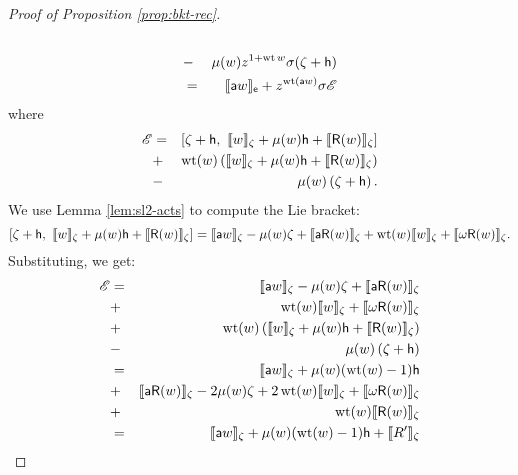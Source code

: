 \begin{proof}[Proof of Proposition \ref{prop:bkt-rec}]
\begin{eqnarray*}
                      \\ &-& \mu(w) z^{1+\operatorname{\mathrm{wt}} w}\sigma(\zeta +\mathsf{h})
                      \\ &=& \llbracket{\mathsf{a}w}\rrbracket_{\mathsf{e}} + z^{\operatorname{\mathrm{wt}}(\mathsf{a} w)} \sigma \mathscr{E}
\end{eqnarray*}
where
\begin{eqnarray*}
        \mathscr{E} &=& [\zeta+\mathsf{h},\ \llbracket{w}\rrbracket_\zeta + \mu(w)\mathsf{h} + \llbracket{\mathsf{R}(w)}\rrbracket_\zeta ]
         \\ &+& \operatorname{\mathrm{wt}}(w) \left( \llbracket{w}\rrbracket_\zeta+\mu(w)\mathsf{h} + \llbracket{\mathsf{R}(w)}\rrbracket_\zeta\right)
         \\ &-& \mu(w) \left(\zeta+\mathsf{h}\right).
\end{eqnarray*}
     We use Lemma \ref{lem:sl2-acts} to compute the Lie bracket:
        \[
                [\zeta+\mathsf{h},\ \llbracket{w}\rrbracket_\zeta + \mu(w)\mathsf{h} + \llbracket{\mathsf{R}(w)}\rrbracket_\zeta ] = \llbracket{\mathsf{a}w}\rrbracket_\zeta - \mu(w)\zeta + \llbracket{\mathsf{a}\mathsf{R}(w)}\rrbracket_\zeta 
                                                                   + \operatorname{\mathrm{wt}}(w)\llbracket{w}\rrbracket_\zeta + \llbracket{\omega\mathsf{R}(w)}\rrbracket_\zeta.
                                                           \]
Substituting, we get:
\begin{eqnarray*}
        \sE &=& \bkt{\a w}_\zeta - \mu(w)\zeta + \bkt{\a\R(w)}_\zeta \\
            &+& \wt(w) \bkt{w}_\zeta + \bkt{\omega\R(w)}_\zeta \\
            &+& \wt(w) \left(\bkt{w}_\zeta+\mu(w)\h+\bkt{\R(w)}_\zeta\right) \\
            &-& \mu(w)\left(\zeta+\h\right) \\
            &=& \bkt{\a w}_\zeta + \mu(w)(\wt(w)-1)\h \\
            &+& \bkt{\a\R(w)}_\zeta - 2\mu(w)\zeta + 2\wt(w)\bkt{w}_\zeta + \bkt{\omega\R(w)}_\zeta \\
            &+& \wt(w)\bkt{\R(w)}_\zeta \\
            &=& \bkt{\a w}_\zeta + \mu(w)(\wt(w)-1)\h + \bkt{R'}_\zeta

\end{eqnarray*}
\end{proof}
